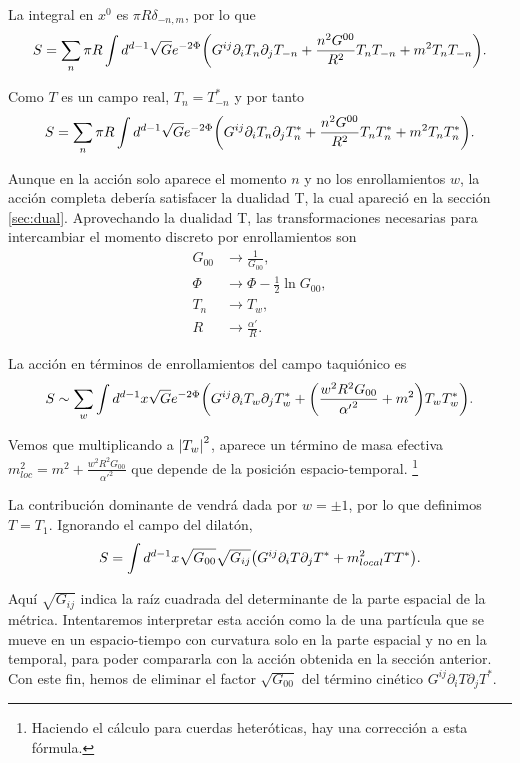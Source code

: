 La integral en $x^0$ es $\pi R \delta_{-n,m}$, por lo que
\begin{equation}
  S=\sum_n\pi R \int d^{d-1} \sqrt{G}e^{-2\Phi}\qty(G^{ij}\partial_i T_n \partial_j T_{-n} + \frac{n^2 G^{00}}{R^2}T_n T_{-n} + m^2 T_n T_{-n}).
\end{equation}

Como $T$ es un campo real, $T_n=T^*_{-n}$ y por tanto
\begin{equation}
  S=\sum_n \pi R \int d^{d-1} \sqrt{G}e^{-2\Phi}\qty(G^{ij}\partial_i T_n \partial_j T_{n}^* + \frac{n^2 G^{00}}{R^2}T_n T_{n}^* + m^2 T_n T_{n}^*).
\end{equation}

Aunque en la acción solo aparece el momento $n$ y no los enrollamientos $w$, la acción completa debería satisfacer la dualidad T, 
la cual apareció en la sección \ref{sec:dual}.
Aprovechando la dualidad T, las  transformaciones necesarias para intercambiar el momento discreto por enrollamientos son
\begin{equation}
  \begin{aligned}
    G_{00}&\to \frac{1}{G_{00}},\\
    \Phi&\to \Phi -\frac{1}{2}\ln G_{00},\\
    T_n&\to T_w,\\
    R &\to \frac{\alpha'}{R}.
  \end{aligned}
\end{equation}

La acción en términos de enrollamientos del campo taquiónico es
\begin{equation}
  S \sim\sum_w  \int d^{d-1} x \sqrt G e^{-2\Phi}\qty(G^{ij}\partial_i T_w \partial_j T_{w}^* + \qty(\frac{w^2 R^2 G_{00}}{{\alpha'}^2} + m^2) T_w T_{w}^*) .
\end{equation}

Vemos que multiplicando a $\abs{T_w}^2$, aparece un término de masa efectiva $m^2_{loc} = m^2 +\frac{w^2 R^2 G_{00}}{{\alpha'}^2}$
que depende de la posición espacio-temporal.
\footnote{Haciendo el cálculo para cuerdas heteróticas, hay una corrección a esta fórmula.}

La contribución dominante de vendrá dada por $w=\pm 1$, por lo que definimos $T=T_1$.
Ignorando el campo del dilatón,
\begin{equation}
  S  =  \int d^{d-1} x \sqrt{G_{00}}\sqrt{G_{ij}} \qty(G^{ij}\partial_i T \partial_j T^* +m^2_{local} TT^*) .
\end{equation}

Aquí $\sqrt{G_{ij}}$ indica la raíz cuadrada del determinante de la parte espacial de la métrica.
Intentaremos interpretar esta acción como la de una partícula que se mueve en un espacio-tiempo con 
curvatura solo en la parte espacial y no en la temporal, para poder compararla con la acción obtenida
en la sección anterior.
Con este fin, hemos de eliminar el factor $\sqrt{G_{00}}$ del término cinético $G^{ij}\partial_i T \partial_j T^*$.

